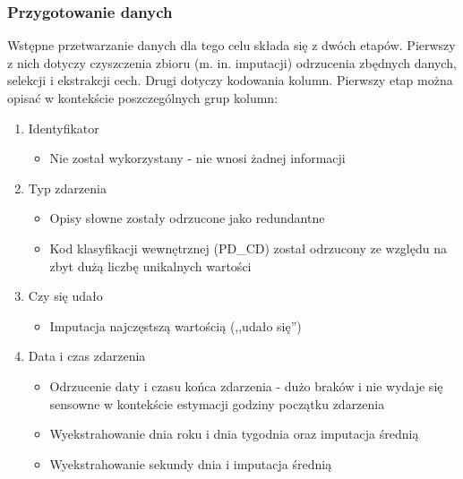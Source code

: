 \documentclass{classrep}
\begin{document}
{{            \subsubsection{Przygotowanie danych} {
                Wstępne przetwarzanie danych dla tego celu składa się z dwóch etapów.
                Pierwszy z nich dotyczy czyszczenia zbioru (m. in. imputacji)
                odrzucenia zbędnych danych, selekcji i ekstrakcji cech. Drugi dotyczy
                kodowania kolumn. Pierwszy etap można opisać w kontekście
                poszczególnych grup kolumn:
                \begin{enumerate}
                    \item Identyfikator
                    \begin{itemize}
                        \item Nie został wykorzystany - nie wnosi żadnej informacji
                    \end{itemize}
                    \item Typ zdarzenia
                    \begin{itemize}
                        \item Opisy słowne zostały odrzucone jako redundantne
                        \item Kod klasyfikacji wewnętrznej (PD\_CD) został odrzucony ze
                        względu na zbyt dużą liczbę unikalnych wartości
                    \end{itemize}
                    \item Czy się udało
                    \begin{itemize}
                        \item Imputacja najczęstszą wartością (,,udało się'')
                    \end{itemize}
                    \item Data i czas zdarzenia
                    \begin{itemize}
                        \item Odrzucenie daty i czasu końca zdarzenia - dużo braków i nie wydaje
                        się sensowne w kontekście estymacji godziny początku zdarzenia
                        \item Wyekstrahowanie dnia roku i dnia tygodnia oraz imputacja średnią
                        \item Wyekstrahowanie sekundy dnia i imputacja średnią
                    \end{itemize}

\end{enumerate}}}}
\end{document}
